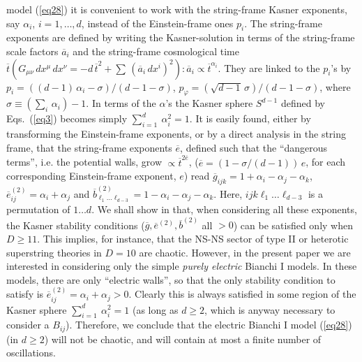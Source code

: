 \documentclass[a4paper,12pt]{article}
\begin{document}
model (\ref{eq28}) it is convenient to work with the string-frame 
Kasner exponents, say $\alpha_i$, $i = 1, \ldots , d$, instead of the 
Einstein-frame ones $p_i$. The string-frame exponents are defined by 
writing the Kasner-solution in terms of the string-frame scale factors 
$\overline{a}_i$ and the string-frame cosmological time $\overline t 
\left( G_{\mu \nu} \, dx^{\mu} \, dx^{\nu} =  - d \, \overline t^2 + 
\sum \, (\overline a_i \, dx^i)^2 \right) :  \overline a_i \propto 
\overline t^{\alpha_i}$. They are linked to the $p_i$'s by
$p_i = ((d-1) \, \alpha_i - \sigma)/(d-1- \sigma)$, 
$ p_{\varphi} 
= (\sqrt{d-1} \, \sigma)/(d-1- \sigma)$,
where $\sigma \equiv \left( \sum_i \, \alpha_i \right) - 1$. In terms 
of the $\alpha$'s the Kasner sphere $S^{d-1}$ defined by 
Eqs.~(\ref{eq3}) becomes simply
$\sum_{i=1}^d \ \alpha_i^2 = 1$. 
It is easily found, either by transforming the Einstein-frame exponents, 
or by a direct analysis in the string frame, 
that the string-frame exponents $\overline e$, defined such that the 
``dangerous terms'', i.e. the potential walls, grow $\propto \overline 
t^{2 \overline e}$, ($\overline e = (1-\sigma / (d-1)) \, e$, for each 
corresponding Einstein-frame exponent, $e$) read
$\overline g_{ijk} = 1 + \alpha_i - \alpha_j - \alpha_k$,
$\overline e_{ij}^{(2)} = \alpha_i + \alpha_j$
and $\overline b_{\ell_1 \ldots \ell_{d-3}}^{(2)} = 1 - \alpha_i - \alpha_j 
- \alpha_k$.
Here, $ijk\ell_1 \ldots \ell_{d-3}$ is a permutation of 
$1 \ldots d$. We shall show in \cite{dh2} that, when considering all 
these exponents, the Kasner stability conditions ($\overline 
g , \overline e^{(2)} , \overline b^{(2)}$ all $>0$) can be satisfied 
only when $D \geq 11$. This implies, for instance, that the NS-NS 
sector of type II or heterotic superstring theories in $D=10$ are 
chaotic. However, in the present paper we are interested in considering 
only the simple {\it purely electric} Bianchi I models. In these models, 
there are only ``electric walls'', so that the only stability condition 
to satisfy is $\overline e_{ij}^{(2)} = \alpha_i + \alpha_j > 0$. 
Clearly this is always satisfied in some region of the Kasner sphere 
$\sum_{i=1}^d \ \alpha_i^2 = 1$
(as long as $d \geq 2$, which is anyway necessary to 
consider a $B_{ij}$). Therefore, we conclude that the electric Bianchi 
I model (\ref{eq28}) (in $d \geq 2$) will not be chaotic, and will 
contain at most a finite number of oscillations. 
\end{document}
